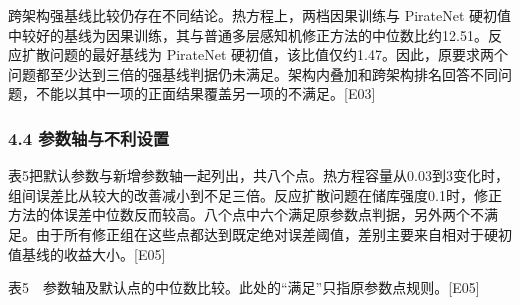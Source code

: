 \documentclass[11pt,a4paper]{article}
\begin{document}
跨架构强基线比较仍存在不同结论。热方程上，两档因果训练与 PirateNet 硬初值中较好的基线为因果训练，其与普通多层感知机修正方法的中位数比约12.51。反应扩散问题的最好基线为 PirateNet 硬初值，该比值仅约1.47。因此，原要求两个问题都至少达到三倍的强基线判据仍未满足。架构内叠加和跨架构排名回答不同问题，不能以其中一项的正面结果覆盖另一项的不满足。{[}E03{]}

\subsubsection{4.4 参数轴与不利设置}\label{ux53c2ux6570ux8f74ux4e0eux4e0dux5229ux8bbeux7f6e}

表5把默认参数与新增参数轴一起列出，共八个点。热方程容量从0.03到3变化时，组间误差比从较大的改善减小到不足三倍。反应扩散问题在储库强度0.1时，修正方法的体误差中位数反而较高。八个点中六个满足原参数点判据，另外两个不满足。由于所有修正组在这些点都达到既定绝对误差阈值，差别主要来自相对于硬初值基线的收益大小。{[}E05{]}

表5　参数轴及默认点的中位数比较。此处的``满足''只指原参数点规则。{[}E05{]}
\end{document}
